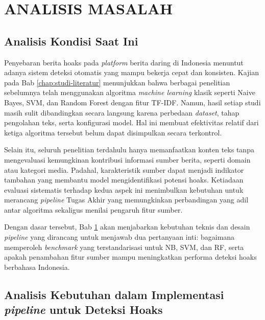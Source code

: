 \chapter{ANALISIS MASALAH}
\label{chap:analisis-masalah}
\section{Analisis Kondisi Saat Ini}
Penyebaran berita hoaks pada \textit{platform} berita daring di Indonesia menuntut adanya sistem deteksi otomatis yang mampu bekerja cepat dan konsisten. Kajian pada Bab \ref{chap:studi-literatur} menunjukkan bahwa berbagai penelitian sebelumnya telah menggunakan algoritma \textit{machine learning} klasik seperti Naive Bayes, SVM, dan Random Forest dengan fitur TF-IDF. Namun, hasil setiap studi masih sulit dibandingkan secara langsung karena perbedaan \textit{dataset}, tahap pengolahan teks, serta konfigurasi model. Hal ini membuat efektivitas relatif dari ketiga algoritma tersebut belum dapat disimpulkan secara terkontrol.

Selain itu, seluruh penelitian terdahulu hanya memanfaatkan konten teks tanpa mengevaluasi kemungkinan kontribusi informasi sumber berita, seperti domain atau kategori media. Padahal, karakteristik sumber dapat menjadi indikator tambahan yang membantu model mengidentifikasi potensi hoaks. Ketiadaan evaluasi sistematis terhadap kedua aspek ini menimbulkan kebutuhan untuk merancang \textit{pipeline} Tugas Akhir yang memungkinkan perbandingan yang adil antar algoritma sekaligus menilai pengaruh fitur sumber.

Dengan dasar tersebut, Bab \ref{chap:analisis-masalah} akan menjabarkan kebutuhan teknis dan desain \textit{pipeline} yang dirancang untuk menjawab dua pertanyaan inti: bagaimana memperoleh \textit{\textit{benchmark}} yang terstandarisasi untuk NB, SVM, dan RF, serta apakah penambahan fitur sumber mampu meningkatkan performa deteksi hoaks berbahasa Indonesia.




\section{Analisis Kebutuhan dalam Implementasi \textit{pipeline} untuk Deteksi Hoaks}

